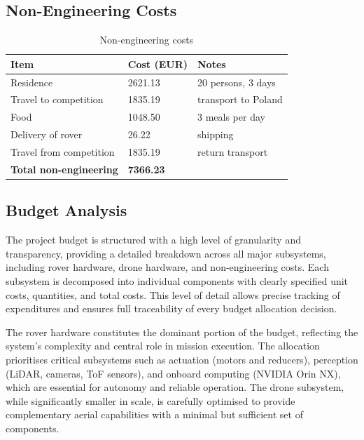 \subsection{Non-Engineering Costs}
\label{subsec:non_eng_costs}

\begin{table}[H]
    \centering
    \caption{Non-engineering costs}
    \label{tab:non_eng}
    \begin{tabular}{L{5cm} R{2.5cm} L{4cm}}
        \toprule
        \textbf{Item} & \textbf{Cost (EUR)} & \textbf{Notes} \\
        \midrule
        Residence                    & 2621.13 & 20 persons, 3 days \\
        Travel to competition        & 1835.19 & transport to Poland \\
        Food                         & 1048.50 & 3 meals per day \\
        Delivery of rover            & 26.22   & shipping \\
        Travel from competition      & 1835.19 & return transport \\
        \midrule
        \textbf{Total non-engineering} & \textbf{7366.23} & \\
        \bottomrule
    \end{tabular}
\end{table}

\subsection{Budget Analysis}
\label{subsec:budget_analysis}

The project budget is structured with a high level of granularity and transparency, 
providing a detailed breakdown across all major subsystems, including rover hardware, 
drone hardware, and non-engineering costs. Each subsystem is decomposed into individual 
components with clearly specified unit costs, quantities, and total costs. This level of 
detail allows precise tracking of expenditures and ensures full traceability of every 
budget allocation decision.

The rover hardware constitutes the dominant portion of the budget, reflecting the 
system's complexity and central role in mission execution. The allocation prioritises 
critical subsystems such as actuation (motors and reducers), perception (LiDAR, cameras, 
ToF sensors), and onboard computing (NVIDIA Orin NX), which are essential for autonomy 
and reliable operation. The drone subsystem, while significantly smaller in scale, is 
carefully optimised to provide complementary aerial capabilities with a minimal but 
sufficient set of components.

